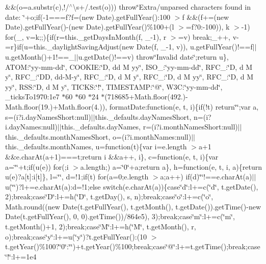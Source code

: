 {{\begin{DoxyParamCaption}
\&\&(o=a.\+substr(c),!/$^\wedge$\textbackslash{}s+/.\+test(o))) throw\char`\"{}\+Extra/unparsed characters found in date\+: \char`\"{}+o;if(-\/1===f?f=(new Date).\+get\+Full\+Year()\+:100 $>$f \&\&(f+=(new Date).\+get\+Full\+Year()-\/(new Date).\+get\+Full\+Year()\%100+(l $>$=f?0\+:-\/100)), k $>$-\/1) for(\+\_, v=k;;)\{if(r=this.\+\_\+get\+Days\+In\+Month(f, \+\_\+-\/1), r $>$=v) break;\+\_\+++, v-\/=r\}if(u=this.\+\_\+daylight\+Saving\+Adjust(new Date(f, \+\_\+-\/1, v)), u.\+get\+Full\+Year()!==f$\vert$$\vert$u.\+get\+Month()+1!==\+\_\+$\vert$$\vert$u.\+get\+Date()!==v) throw\char`\"{}\+Invalid date\char`\"{};return u\}, A\+T\+O\+M\+:\char`\"{}yy-\/mm-\/dd\char`\"{}, C\+O\+O\+K\+I\+E\+:\char`\"{}\+D, dd M yy\char`\"{}, I\+S\+O\+\_\+:\char`\"{}yy-\/mm-\/dd\char`\"{}, R\+F\+C\+\_\+:\char`\"{}\+D, d M y\char`\"{}, R\+F\+C\+\_\+:\char`\"{}\+D\+D, dd-\/\+M-\/y\char`\"{}, R\+F\+C\+\_\+:\char`\"{}\+D, d M y\char`\"{}, R\+F\+C\+\_\+:\char`\"{}\+D, d M yy\char`\"{}, R\+F\+C\+\_\+:\char`\"{}\+D, d M yy\char`\"{}, R\+S\+S\+:\char`\"{}\+D, d M y\char`\"{}, T\+I\+C\+K\+S\+:\char`\"{}!\char`\"{}, T\+I\+M\+E\+S\+T\+A\+M\+P\+:\char`\"{}@\char`\"{}, W3\+C\+:\char`\"{}yy-\/mm-\/dd\char`\"{}, \+\_\+ticks\+To1970\+:1e7 $\ast$60 $\ast$60 $\ast$24 $\ast$(718685+\+Math.\+floor(492.)-\/\+Math.\+floor(19.)+\+Math.\+floor(4.)), format\+Date\+:function(e, t, i)\{if(!t) return\char`\"{}\char`\"{};var a, s=(i?i.\+day\+Names\+Short\+:null)$\vert$$\vert$this.\+\_\+defaults.\+day\+Names\+Short, n=(i?i.\+day\+Names\+:null)$\vert$$\vert$this.\+\_\+defaults.\+day\+Names, r=(i?i.\+month\+Names\+Short\+:null)$\vert$$\vert$this.\+\_\+defaults.\+month\+Names\+Short, o=(i?i.\+month\+Names\+:null)$\vert$$\vert$this.\+\_\+defaults.\+month\+Names, u=function(t)\{var i=e.\+length $>$a+1 \&\&e.\+char\+At(a+1)===t;return i \&\&a++, i\}, c=function(e, t, i)\{var a=\char`\"{}\char`\"{}+t;if(u(e)) for(;i $>$a.\+length;) a=\char`\"{}0\char`\"{}+a;return a\}, h=function(e, t, i, a)\{return u(e)?a\mbox{[}t\mbox{]}\+:i\mbox{[}t\mbox{]}\}, l=\char`\"{}\char`\"{}, d=!1;if(t) for(a=0;e.\+length $>$a;a++) if(d)\char`\"{}\textquotesingle{}\char`\"{}!==e.\+char\+At(a)$\vert$$\vert$u(\char`\"{}\textquotesingle{}\char`\"{})?l+=e.\+char\+At(a)\+:d=!1;else switch(e.\+char\+At(a))\{case\char`\"{}d\char`\"{}\+:l+=c(\char`\"{}d\char`\"{}, t.\+get\+Date(), 2);break;case\char`\"{}\+D\char`\"{}\+:l+=h(\char`\"{}\+D\char`\"{}, t.\+get\+Day(), s, n);break;case\char`\"{}o\char`\"{}\+:l+=c(\char`\"{}o\char`\"{}, Math.\+round((new Date(t.\+get\+Full\+Year(), t.\+get\+Month(), t.\+get\+Date()).\+get\+Time()-\/new Date(t.\+get\+Full\+Year(), 0, 0).\+get\+Time())/864e5), 3);break;case\char`\"{}m\char`\"{}\+:l+=c(\char`\"{}m\char`\"{}, t.\+get\+Month()+1, 2);break;case\char`\"{}\+M\char`\"{}\+:l+=h(\char`\"{}\+M\char`\"{}, t.\+get\+Month(), r, o);break;case\char`\"{}y\char`\"{}\+:l+=u(\char`\"{}y\char`\"{})?t.\+get\+Full\+Year()\+:(10 $>$t.\+get\+Year()\%100?\char`\"{}0\char`\"{}\+:\char`\"{}\char`\"{})+t.\+get\+Year()\%100;break;case\char`\"{}@\char`\"{}\+:l+=t.\+get\+Time();break;case\char`\"{}!\char`\"{}\+:l+=1e4 
\end{DoxyParamCaption}}}
